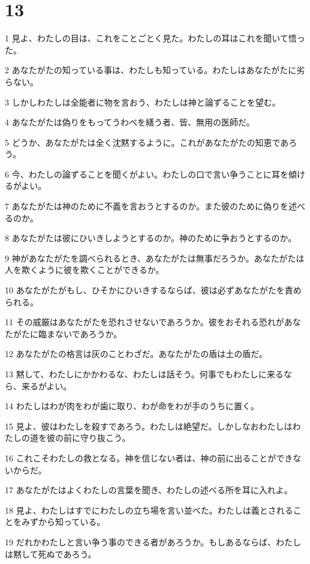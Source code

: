 \chapter{13}

\par 1 見よ、わたしの目は、これをことごとく見た。わたしの耳はこれを聞いて悟った。
\par 2 あなたがたの知っている事は、わたしも知っている。わたしはあなたがたに劣らない。
\par 3 しかしわたしは全能者に物を言おう、わたしは神と論ずることを望む。
\par 4 あなたがたは偽りをもってうわべを繕う者、皆、無用の医師だ。
\par 5 どうか、あなたがたは全く沈黙するように。これがあなたがたの知恵であろう。
\par 6 今、わたしの論ずることを聞くがよい。わたしの口で言い争うことに耳を傾けるがよい。
\par 7 あなたがたは神のために不義を言おうとするのか。また彼のために偽りを述べるのか。
\par 8 あなたがたは彼にひいきしようとするのか。神のために争おうとするのか。
\par 9 神があなたがたを調べられるとき、あなたがたは無事だろうか。あなたがたは人を欺くように彼を欺くことができるか。
\par 10 あなたがたがもし、ひそかにひいきするならば、彼は必ずあなたがたを責められる。
\par 11 その威厳はあなたがたを恐れさせないであろうか。彼をおそれる恐れがあなたがたに臨まないであろうか。
\par 12 あなたがたの格言は灰のことわざだ。あなたがたの盾は土の盾だ。
\par 13 黙して、わたしにかかわるな、わたしは話そう。何事でもわたしに来るなら、来るがよい。
\par 14 わたしはわが肉をわが歯に取り、わが命をわが手のうちに置く。
\par 15 見よ、彼はわたしを殺すであろう。わたしは絶望だ。しかしなおわたしはわたしの道を彼の前に守り抜こう。
\par 16 これこそわたしの救となる。神を信じない者は、神の前に出ることができないからだ。
\par 17 あなたがたはよくわたしの言葉を聞き、わたしの述べる所を耳に入れよ。
\par 18 見よ、わたしはすでにわたしの立ち場を言い並べた。わたしは義とされることをみずから知っている。
\par 19 だれかわたしと言い争う事のできる者があろうか。もしあるならば、わたしは黙して死ぬであろう。
